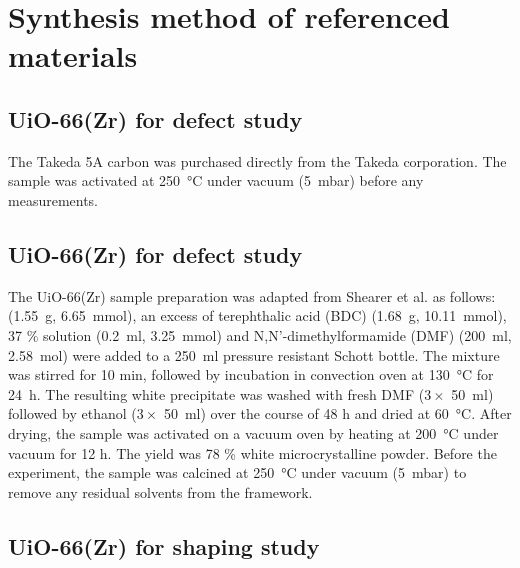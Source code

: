 
\graphicspath{ {\thisappx/figures/} }

\chapter{Synthesis method of referenced materials}%
\label{appx:synthesis}

\section{UiO-66(Zr) for defect study}%
\label{appx:synthesis:takeda}

The Takeda 5A carbon was purchased directly from the Takeda corporation.
The sample was activated at \SI{250}{\celsius} under vacuum (\SI{5}{\milli\bar})
before any measurements.

\section{UiO-66(Zr) for defect study}%
\label{appx:synthesis:uio66def}

The UiO-66(Zr) sample preparation was adapted from Shearer et al. 
\cite{shearerTunedToPerfection2014} as follows:
 (\SI{1.55}{\gram}, \SI{6.65}{\milli\mol}), an excess of 
terephthalic acid (BDC)
(\SI{1.68}{\gram}, \SI{10.11}{\milli\mol}),  37 \% solution 
(\SI{0.2}{\milli\litre}, \SI{3.25}{\milli\mol}) and N,N’-dimethylformamide (DMF) 
(\SI{200}{\milli\litre}, \SI{2.58}{\mol}) were added to a \SI{250}{\milli\litre}
pressure resistant Schott bottle. The mixture was stirred for 10 min, followed by incubation in 
convection oven at \SI{130}{\celsius} for \SI{24}{\hour}. The resulting white precipitate was 
washed with fresh DMF (\(3 \times \) \SI{50}{\milli\litre}) 
followed by ethanol (\(3 \times \) \SI{50}{\milli\litre})
over the course of 48 h and dried at \SI{60}{\celsius}. After drying, 
the sample was activated 
on a vacuum oven by heating at \SI{200}{\celsius} under vacuum for 12 h. 
The yield was 78 \% white microcrystalline powder. Before the experiment, 
the sample was calcined
at \SI{250}{\celsius} under vacuum (\SI{5}{\milli\bar}) to remove any residual solvents
from the framework.

\section{UiO-66(Zr) for shaping study}%
\label{appx:synthesis:uio66shaping}

